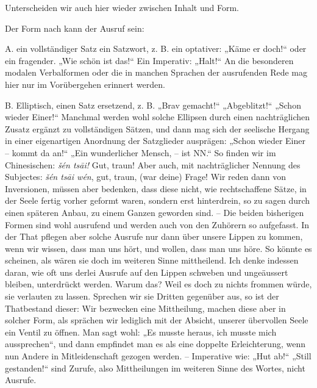 Unterscheiden wir auch hier wieder zwischen Inhalt und Form.

Der Form nach kann der Ausruf sein:

\label{IV.III.I.A}A. ein vollständiger Satz  ein Satzwort, z. B. ein optativer: „Käme er doch!“ oder ein fragender. „Wie schön ist das!“ Ein Imperativ: „Halt!“ An die besonderen modalen Verbalformen oder  die in manchen Sprachen der ausrufenden Rede  mag hier nur im Vorübergehen erinnert werden.

\label{fp.312} \label{sp.321}

\label{IV.III.I.B}B. Elliptisch, einen Satz ersetzend, z. B. „Brav gemacht!“ „Abgeblitzt!“ „Schon wieder Einer!“ Manchmal werden wohl solche Ellipsen durch einen nachträglichen Zusatz ergänzt zu vollständigen Sätzen, und dann mag sich der seelische Hergang in einer eigenartigen Anordnung der Satzglieder ausprägen: „Schon wieder Einer – kommt da an!“ „Ein wunderlicher Mensch, – ist NN.“ So finden wir im Chinesischen: \textit{šén tsāi!} Gut, traun! Aber auch, mit nachträglicher Nennung des Subjectes: \textit{šén tsāi wén}, gut, traun, (war deine) Frage! Wir reden dann von Inversionen, müssen aber bedenken, dass diese nicht, wie rechtschaffene Sätze, in der Seele fertig vorher geformt waren, sondern erst hinterdrein, so zu sagen durch einen späteren Anbau, zu einem Ganzen geworden sind. – Die beiden bisherigen Formen sind wohl ausrufend und werden auch von den Zuhörern so aufgefasst. In der That pflegen aber solche Ausrufe nur dann über unsere Lippen zu kommen, wenn wir wissen, dass man uns hört, und wollen, dass man uns höre. So könnte es scheinen, als wären sie doch im weiteren Sinne mittheilend. Ich denke indessen daran, wie oft uns derlei Ausrufe auf den Lippen schweben und ungeäussert bleiben, unterdrückt werden. Warum das? Weil es doch zu nichts frommen würde, sie verlauten zu lassen. Sprechen wir sie Dritten gegenüber aus, so ist der Thatbestand dieser: Wir bezwecken eine Mittheilung, machen diese aber in solcher Form, als sprächen wir lediglich mit der Absicht, unserer übervollen Seele ein Ventil zu öffnen. Man sagt wohl: „Es musste heraus, ich musste mich aussprechen“, und dann empfindet man es als eine doppelte Erleichterung, wenn nun Andere in Mitleidenschaft gezogen werden. – Imperative wie: „Hut ab!“ „Still gestanden!“ sind Zurufe, also Mittheilungen im weiteren Sinne des Wortes, nicht Ausrufe.

